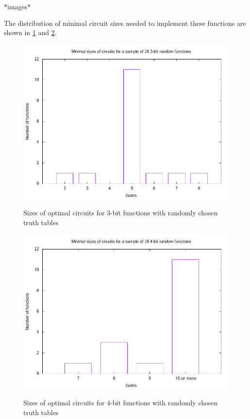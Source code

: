 \documentclass{article}
\begin{document}
*images*

The distribution of minimal circuit sizes needed to implement these functions are shown in \ref{fig:3rand_sizes} and \ref{fig:4rand_sizes}.

\begin{figure}[!ht]
  \includegraphics[width=\textwidth]{images/3rand_sizes.png}
  \label{fig:3rand_sizes}
  \caption{Sizes of optimal circuits for 3-bit functions with randomly chosen truth tables}
\end{figure}
\begin{figure}[!ht]
  \includegraphics[width=\textwidth]{images/4rand_sizes.png}
  \label{fig:4rand_sizes}
  \caption{Sizes of optimal circuits for 4-bit functions with randomly chosen truth tables}

\end{figure}
\end{document}

